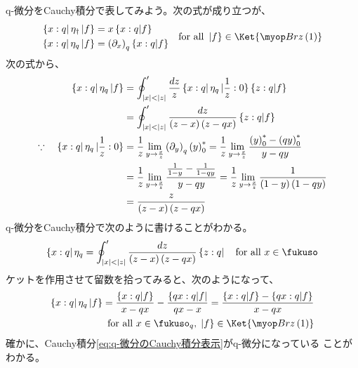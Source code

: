{	q-微分をCauchy積分で表してみよう。次の式が成り立つが、
	\begin{equation*}\begin{split}
		\cbra{x:q}\eta_\dag\cket{f} &= x\cbraket{x:q|f} \\
		\cbra{x:q}\eta_q\cket{f} &= \lr{\partial_x}_q\cbraket{x:q|f} \\
	\end{split}
		\quad\text{for all } \cket{f}\in\Ket{\Brz\lr{1}}
	\end{equation*}
	次の式から、
	\begin{equation*}\begin{split}
		\cbra{x:q}\eta_q\cket{f}
		&= \oint'_{|x|<|z|} \frac{dz}{z} \cbra{x:q}\eta_q\cket{\frac{1}{z}:0}
			\cbraket{z:q|f} \\
		&= \oint'_{|x|<|z|} \frac{dz}{\lr{z - x}\lr{z - qx}} \cbraket{z:q|f} \\
		\because\quad \cbra{x:q}\eta_q\cket{\frac{1}{z}:0}
		&= \frac{1}{z} \lim_{y\to\frac{x}{z}} \lr{\partial_y}_q\lr{y}_0^*
		= \frac{1}{z} \lim_{y\to\frac{x}{z}} 
			\frac{\lr{y}_0^* - \lr{qy}_0^*}{y - qy} \\
		&= \frac{1}{z} \lim_{y\to\frac{x}{z}}
			\frac{\frac{1}{1 - y} - \frac{1}{1 - qy}}{y - qy}
		= \frac{1}{z} \lim_{y\to\frac{x}{z}} \frac{1}{\lr{1- y}\lr{1 - qy}} \\
		&= \frac{z}{\lr{z - x}\lr{z - qx}}
	\end{split}\end{equation*}
	q-微分をCauchy積分で次のように書けることがわかる。
	\begin{equation}\label{eq:q-微分のCauchy積分表示}\begin{split}
		\cbra{x:q}\eta_q 
		= \oint'_{|x|<|z|} \frac{dz}{\lr{z - x}\lr{z - qx}} \cbra{z:q}
		\quad\text{for all } x\in\fukuso
	\end{split}\end{equation}
	ケットを作用させて留数を拾ってみると、次のようになって、
	\begin{equation*}\begin{split}
		\cbra{x:q}\eta_q\cket{f}
		= \frac{\cbraket{x:q|f}}{x - qx} - \frac{\cbra{qx:q|f}}{qx - x}
		= \frac{\cbraket{x:q|f} - \cbraket{qx:q|f}}{x - qx} \\
		\quad\text{for all } x\in\fukuso_q,\; \cket{f}\in\Ket{\Brz\lr{1}}
	\end{split}\end{equation*}
	確かに、Cauchy積分\eqref{eq:q-微分のCauchy積分表示}がq-微分になっている
	ことがわかる。

}
